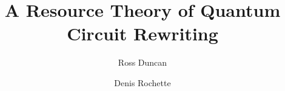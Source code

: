 


\title{A Resource Theory of Quantum Circuit Rewriting}
\date{}
\author{Ross Duncan \and Denis Rochette}


